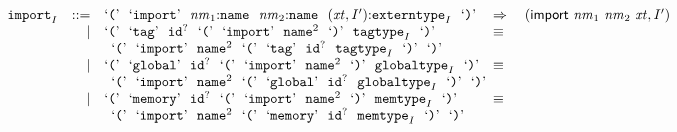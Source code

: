 $$
\begin{array}[t]{@{}lrrl@{}l@{}l@{}l@{}}
& {{\mathtt{import}}}_{I} & ::= & \mbox{‘\texttt{{(}}’}~~\mbox{‘\texttt{import}’}~~{\mathit{nm}}_1{:}{\mathtt{name}}~~{\mathit{nm}}_2{:}{\mathtt{name}}~~({\mathit{xt}}, {I'}){:}{{\mathtt{externtype}}}_{I}~~\mbox{‘\texttt{{)}}’} & \quad\Rightarrow\quad{} & (\mathsf{import}~{\mathit{nm}}_1~{\mathit{nm}}_2~{\mathit{xt}}, {I'}) \\
& & | & \mbox{‘\texttt{{(}}’}~~\mbox{‘\texttt{tag}’}~~{{\mathtt{id}}^?}~~\mbox{‘\texttt{{(}}’}~~\mbox{‘\texttt{import}’}~~{{\mathtt{name}}^{2}}~~\mbox{‘\texttt{{)}}’}~~{{\mathtt{tagtype}}}_{I}~~\mbox{‘\texttt{{)}}’} & \quad\equiv\quad{} & & \\
&&& \multicolumn{4}{@{}l@{}}{\quad
\begin{array}[t]{@{}l@{}}
\mbox{‘\texttt{{(}}’}~~\mbox{‘\texttt{import}’}~~{{\mathtt{name}}^{2}}~~\mbox{‘\texttt{{(}}’}~~\mbox{‘\texttt{tag}’}~~{{\mathtt{id}}^?}~~{{\mathtt{tagtype}}}_{I}~~\mbox{‘\texttt{{)}}’}~~\mbox{‘\texttt{{)}}’} \\
\end{array}
} \\
& & | & \mbox{‘\texttt{{(}}’}~~\mbox{‘\texttt{global}’}~~{{\mathtt{id}}^?}~~\mbox{‘\texttt{{(}}’}~~\mbox{‘\texttt{import}’}~~{{\mathtt{name}}^{2}}~~\mbox{‘\texttt{{)}}’}~~{{\mathtt{globaltype}}}_{I}~~\mbox{‘\texttt{{)}}’} & \quad\equiv\quad{} & & \\
&&& \multicolumn{4}{@{}l@{}}{\quad
\begin{array}[t]{@{}l@{}}
\mbox{‘\texttt{{(}}’}~~\mbox{‘\texttt{import}’}~~{{\mathtt{name}}^{2}}~~\mbox{‘\texttt{{(}}’}~~\mbox{‘\texttt{global}’}~~{{\mathtt{id}}^?}~~{{\mathtt{globaltype}}}_{I}~~\mbox{‘\texttt{{)}}’}~~\mbox{‘\texttt{{)}}’} \\
\end{array}
} \\
& & | & \mbox{‘\texttt{{(}}’}~~\mbox{‘\texttt{memory}’}~~{{\mathtt{id}}^?}~~\mbox{‘\texttt{{(}}’}~~\mbox{‘\texttt{import}’}~~{{\mathtt{name}}^{2}}~~\mbox{‘\texttt{{)}}’}~~{{\mathtt{memtype}}}_{I}~~\mbox{‘\texttt{{)}}’} & \quad\equiv\quad{} & & \\
&&& \multicolumn{4}{@{}l@{}}{\quad
\begin{array}[t]{@{}l@{}}
\mbox{‘\texttt{{(}}’}~~\mbox{‘\texttt{import}’}~~{{\mathtt{name}}^{2}}~~\mbox{‘\texttt{{(}}’}~~\mbox{‘\texttt{memory}’}~~{{\mathtt{id}}^?}~~{{\mathtt{memtype}}}_{I}~~\mbox{‘\texttt{{)}}’}~~\mbox{‘\texttt{{)}}’} \\
\end{array}
}
\end{array}$$
